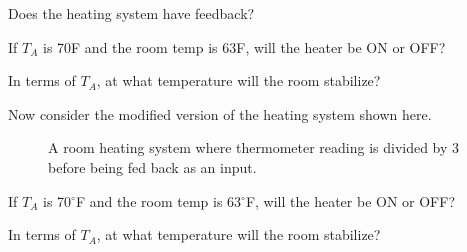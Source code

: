\begin{alevel}
Does the heating system have feedback?
\end{alevel}
\begin{alevel}
If $T_A$ is 70F and the room temp is 63F, will the heater be ON or OFF?
\end{alevel}
\begin{blevel}
In terms of $T_A$, at what temperature will the room stabilize?
\end{blevel}

Now consider the modified version of the heating system shown here.

\begin{figure}[H]
\begin{center}
\caption{A room heating system where thermometer reading is divided by 3 before being fed back as an input.}
\end{center}
\end{figure}

\begin{alevel}
If $T_A$ is 70$^\circ$F and the room temp is 63$^\circ$F, will the heater be ON or OFF?
\end{alevel}
\begin{blevel}
In terms of $T_A$, at what temperature will the room stabilize?
\end{blevel}

